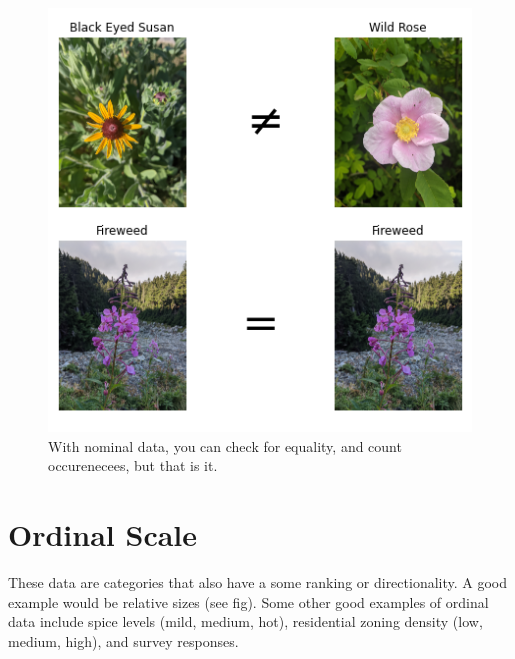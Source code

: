 \documentclass[
]{book}
\begin{document}
\begin{figure}
\centering
\includegraphics{images/03-nominal-opperations.png}
\caption{With nominal data, you can check for equality, and count occurenecees, but that is it.}
\end{figure}

\hypertarget{ordinal-scale}{%
\section{Ordinal Scale}\label{ordinal-scale}}

These data are categories that also have a some ranking or directionality. A good example would be relative sizes (see fig). Some other good examples of ordinal data include spice levels (mild, medium, hot), residential zoning density (low, medium, high), and survey responses.
\end{document}
